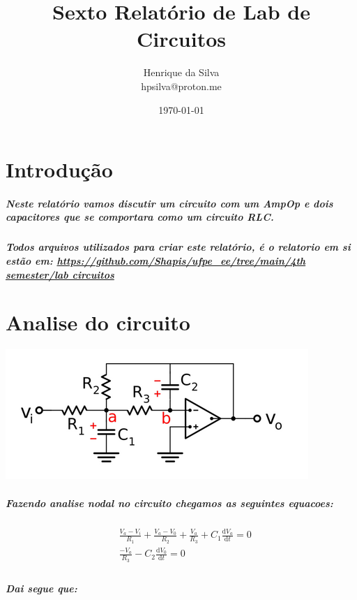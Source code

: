 \documentclass[12pt,twoside, a4paper, twocolumn]{article}
\title{Sexto Relatório de Lab de Circuitos}
\author{Henrique da Silva \\ hpsilva@proton.me}
\date{\today}
\newcommand\deriv[2]{\frac{\mathrm d #1}{\mathrm d #2}}
\begin{document}
\maketitle
{}
\newpage
\tableofcontents
\newpage



\section{Introdução}

\subparagraph*{Neste relatório vamos discutir um circuito com um AmpOp e dois capacitores que se comportara como um circuito RLC.}

\subparagraph*{Todos arquivos utilizados para criar este relatório, é o relatorio em si estão em:  \url{https://github.com/Shapis/ufpe_ee/tree/main/4th semester/lab circuitos}}


\section{Analise do circuito}

\begin{adjustbox}{scale=0.6}
    \includegraphics{Figure_2.png}
\end{adjustbox}

\subparagraph*{Fazendo analise nodal no circuito chegamos as seguintes equacoes:}

\begin{equation}
    \begin{aligned}
         & \frac{V_a - V_i}{R_1} + \frac{V_a - V_0}{R_2} + \frac{V_a}{R_3} + C_1 \deriv{V_a}{t} = 0 \\
         & \frac{-V_a}{R_3} - C_2 \deriv{V_0}{t} = 0                                                \\
    \end{aligned}
\end{equation}

\subparagraph*{Dai segue que:}
\end{document}
